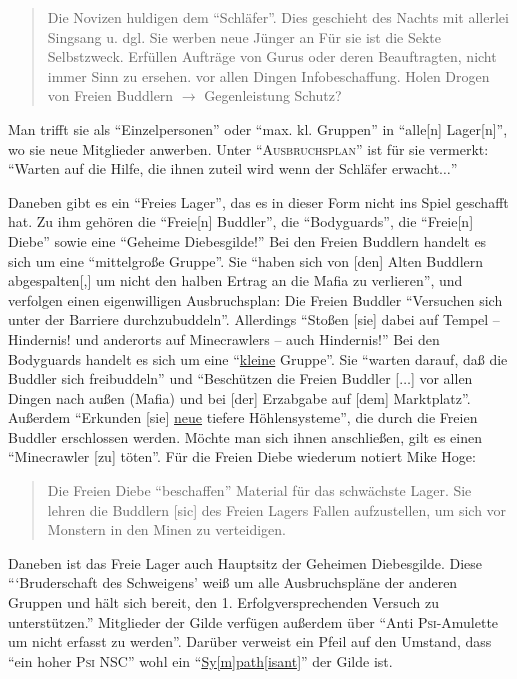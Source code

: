 \documentclass[a5paper,pagesize,numbers=noenddot]{scrbook}
\begin{document}
\begin{quote}
   Die Novizen huldigen dem \enquote{Schläfer}.
   Dies geschieht des Nachts mit allerlei Singsang u. dgl.
   Sie werben neue Jünger an
   Für sie ist die Sekte Selbstzweck.
   Erfüllen Aufträge von Gurus oder deren Beauftragten, nicht immer Sinn zu ersehen.
   vor allen Dingen Infobeschaffung.
   Holen Drogen von Freien Buddlern $\rightarrow$ Gegenleistung Schutz?
\end{quote}

Man trifft sie als \enquote{Einzelpersonen} oder \enquote{max. kl. Gruppen} in \enquote{alle[n] Lager[n]}, wo sie neue Mitglieder anwerben.
Unter \enquote{\textsc{Ausbruchsplan}} ist für sie vermerkt:
\enquote{Warten auf die Hilfe, die ihnen zuteil wird wenn der Schläfer erwacht$\ldots$}

Daneben gibt es ein \enquote{Freies Lager}, das es in dieser Form nicht ins Spiel geschafft hat.
Zu ihm gehören die \enquote{Freie[n] Buddler}, die \enquote{Bodyguards}, die \enquote{Freie[n] Diebe} sowie eine \enquote{Geheime Diebesgilde!}
Bei den Freien Buddlern handelt es sich um eine \enquote{mittelgroße Gruppe}.
Sie \enquote{haben sich von [den] Alten Buddlern abgespalten[,] um nicht den halben Ertrag an die Mafia zu verlieren}, und verfolgen einen eigenwilligen Ausbruchsplan:
Die Freien Buddler \enquote{Versuchen sich unter der Barriere durchzubuddeln}.
Allerdings \enquote{Stoßen [sie] dabei auf Tempel -- Hindernis! und anderorts auf Minecrawlers -- auch Hindernis!}
Bei den Bodyguards handelt es sich um eine \enquote{\uline{kleine} Gruppe}.
Sie \enquote{warten darauf, daß die Buddler sich freibuddeln} und \enquote{Beschützen die Freien Buddler [$\ldots$] vor allen Dingen nach außen (Mafia) und bei [der] Erzabgabe auf [dem] Marktplatz}.
Außerdem \enquote{Erkunden [sie] \uline{neue} tiefere Höhlensysteme}, die durch die Freien Buddler erschlossen werden.
Möchte man sich ihnen anschließen, gilt es einen \enquote{Minecrawler [zu] töten}.
Für die Freien Diebe wiederum notiert Mike Hoge:

\begin{quote}
   Die Freien Diebe \enquote{beschaffen} Material für das schwächste Lager.
   Sie lehren die Buddlern [sic] des Freien Lagers Fallen aufzustellen, um sich vor Monstern in den Minen zu verteidigen.
\end{quote}

Daneben ist das Freie Lager auch Hauptsitz der Geheimen Diebesgilde.
Diese \enquote{\enquote{Bruderschaft des Schweigens} weiß um alle Ausbruchspläne der anderen Gruppen und hält sich bereit, den 1. Erfolgversprechenden Versuch zu unterstützen.}
Mitglieder der Gilde verfügen außerdem über \enquote{Anti \textsc{Psi}-Amulette um nicht erfasst zu werden}.
Darüber verweist ein Pfeil auf den Umstand, dass \enquote{ein hoher \textsc{Psi} NSC} wohl ein \enquote{\uline{Sy[m]path[isant]}} der Gilde ist.
\end{document}
